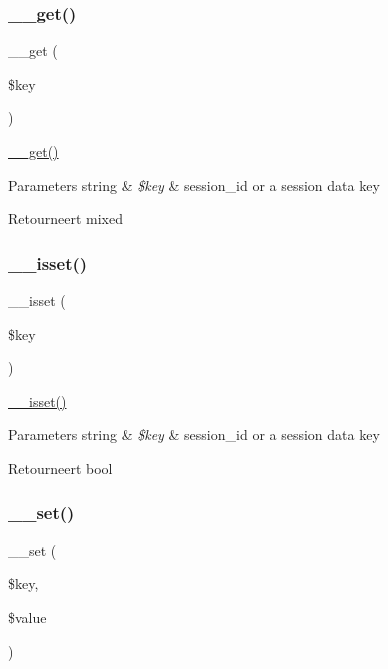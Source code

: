 \subsubsection{\texorpdfstring{\_\_get()}{\_\_get()}}
{\footnotesize\ttfamily \+\_\+\+\_\+get (\begin{DoxyParamCaption}\item[{}]{\$key }\end{DoxyParamCaption})}

\mbox{\hyperlink{class_c_i___session_a4537dad3b44254124991341cc91b28fb}{\+\_\+\+\_\+get()}}


\begin{DoxyParams}[1]{Parameters}
string & {\em \$key} & \textquotesingle{}session\+\_\+id\textquotesingle{} or a session data key \\
\hline
\end{DoxyParams}
\begin{DoxyReturn}{Retourneert}
mixed 
\end{DoxyReturn}
\mbox{\label{class_c_i___session_ae858fed7cd2822fbceac154138b68baa}} 
\subsubsection{\texorpdfstring{\_\_isset()}{\_\_isset()}}
{\footnotesize\ttfamily \+\_\+\+\_\+isset (\begin{DoxyParamCaption}\item[{}]{\$key }\end{DoxyParamCaption})}

\mbox{\hyperlink{class_c_i___session_ae858fed7cd2822fbceac154138b68baa}{\+\_\+\+\_\+isset()}}


\begin{DoxyParams}[1]{Parameters}
string & {\em \$key} & \textquotesingle{}session\+\_\+id\textquotesingle{} or a session data key \\
\hline
\end{DoxyParams}
\begin{DoxyReturn}{Retourneert}
bool 
\end{DoxyReturn}
\mbox{\label{class_c_i___session_a79b36d71c6f1d4f9e6c4c3e34c081456}} 
\subsubsection{\texorpdfstring{\_\_set()}{\_\_set()}}
{\footnotesize\ttfamily \+\_\+\+\_\+set (\begin{DoxyParamCaption}\item[{}]{\$key,  }\item[{}]{\$value }\end{DoxyParamCaption})}

